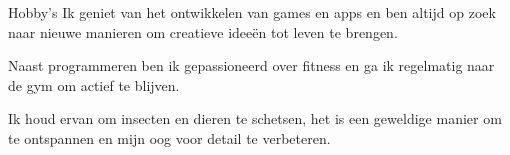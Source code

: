 \begin{rubric}{Hobby's}
    Ik geniet van het ontwikkelen van games en apps en ben altijd op zoek naar nieuwe manieren om creatieve ideeën tot leven te brengen.
    
    Naast programmeren ben ik gepassioneerd over fitness en ga ik regelmatig naar de gym om actief te blijven.\par
    
    Ik houd ervan om insecten en dieren te schetsen, het is een geweldige manier om te ontspannen en mijn oog voor detail te verbeteren.
\end{rubric}

